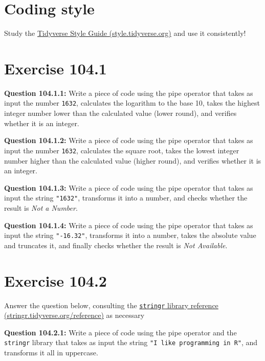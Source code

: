 \documentclass[
]{book}
\begin{document}
\hypertarget{coding-style}{%
\section{Coding style}\label{coding-style}}

Study the \href{http://style.tidyverse.org/}{Tidyverse Style Guide (style.tidyverse.org)} and use it consistently!

\hypertarget{exercise-104.1}{%
\section{Exercise 104.1}\label{exercise-104.1}}

\textbf{Question 104.1.1:} Write a piece of code using the pipe operator that takes as input the number \texttt{1632}, calculates the logarithm to the base 10, takes the highest integer number lower than the calculated value (lower round), and verifies whether it is an integer.

\textbf{Question 104.1.2:} Write a piece of code using the pipe operator that takes as input the number \texttt{1632}, calculates the square root, takes the lowest integer number higher than the calculated value (higher round), and verifies whether it is an integer.

\textbf{Question 104.1.3:} Write a piece of code using the pipe operator that takes as input the string \texttt{"1632"}, transforms it into a number, and checks whether the result is \emph{Not a Number}.

\textbf{Question 104.1.4:} Write a piece of code using the pipe operator that takes as input the string \texttt{"-16.32"}, transforms it into a number, takes the absolute value and truncates it, and finally checks whether the result is \emph{Not Available}.

\hypertarget{exercise-104.2}{%
\section{Exercise 104.2}\label{exercise-104.2}}

Answer the question below, consulting the \href{https://stringr.tidyverse.org/reference/index.html}{\texttt{stringr} library reference (stringr.tidyverse.org/reference)} as necessary

\textbf{Question 104.2.1:} Write a piece of code using the pipe operator and the \texttt{stringr} library that takes as input the string \texttt{"I\ like\ programming\ in\ R"}, and transforms it all in uppercase.
\end{document}
